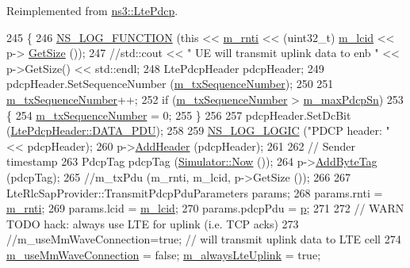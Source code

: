 Reimplemented from \hyperlink{classns3_1_1LtePdcp_ab7db54201309ecb2358b8ae9cff7e4cc}{ns3\+::\+Lte\+Pdcp}.


\begin{DoxyCode}
245 \{
246   \hyperlink{log-macros-disabled_8h_a90b90d5bad1f39cb1b64923ea94c0761}{NS\_LOG\_FUNCTION} (\textcolor{keyword}{this} << \hyperlink{classns3_1_1McUePdcp_a5807c425f6989fee6982fc11fdb5e9a9}{m\_rnti} << (uint32\_t) \hyperlink{classns3_1_1McUePdcp_ad68b36aee03df89a1d476f78c0db4bbc}{m\_lcid} << p->
      \hyperlink{classns3_1_1Packet_a462855c9929954d4301a4edfe55f4f1c}{GetSize} ());
247   \textcolor{comment}{//std::cout << " UE will transmit uplink data to enb " << p->GetSize() << std::endl;}
248   LtePdcpHeader pdcpHeader;
249   pdcpHeader.SetSequenceNumber (\hyperlink{classns3_1_1McUePdcp_a40f14de1c02f288a87aa5f70501cf31e}{m\_txSequenceNumber});
250 
251   \hyperlink{classns3_1_1McUePdcp_a40f14de1c02f288a87aa5f70501cf31e}{m\_txSequenceNumber}++;
252   \textcolor{keywordflow}{if} (\hyperlink{classns3_1_1McUePdcp_a40f14de1c02f288a87aa5f70501cf31e}{m\_txSequenceNumber} > \hyperlink{classns3_1_1McUePdcp_ab397f1cb87dfd3d4362f6d58adf968bc}{m\_maxPdcpSn})
253     \{
254       \hyperlink{classns3_1_1McUePdcp_a40f14de1c02f288a87aa5f70501cf31e}{m\_txSequenceNumber} = 0;
255     \}
256 
257   pdcpHeader.SetDcBit (\hyperlink{classns3_1_1LtePdcpHeader_a3a965023a8f37aad003904c3d64d7ffda5cd4f8c2bc8e87cfae1e626fef42c3d7}{LtePdcpHeader::DATA\_PDU});
258 
259   \hyperlink{group__logging_ga88acd260151caf2db9c0fc84997f45ce}{NS\_LOG\_LOGIC} (\textcolor{stringliteral}{"PDCP header: "} << pdcpHeader);
260   p->\hyperlink{classns3_1_1Packet_a465108c595a0bc592095cbcab1832ed8}{AddHeader} (pdcpHeader);
261 
262   \textcolor{comment}{// Sender timestamp}
263   PdcpTag pdcpTag (\hyperlink{classns3_1_1Simulator_ac3178fa975b419f7875e7105be122800}{Simulator::Now} ());
264   p->\hyperlink{classns3_1_1Packet_ad5997caea8c22757acade2fcb4d7daca}{AddByteTag} (pdcpTag);
265   \textcolor{comment}{//m\_txPdu (m\_rnti, m\_lcid, p->GetSize ());}
266 
267   LteRlcSapProvider::TransmitPdcpPduParameters params;
268   params.rnti = \hyperlink{classns3_1_1McUePdcp_a5807c425f6989fee6982fc11fdb5e9a9}{m\_rnti};
269   params.lcid = \hyperlink{classns3_1_1McUePdcp_ad68b36aee03df89a1d476f78c0db4bbc}{m\_lcid};
270   params.pdcpPdu = \hyperlink{lte__link__budget_8m_ac9de518908a968428863f829398a4e62}{p};
271 
272   \textcolor{comment}{// WARN TODO hack: always use LTE for uplink (i.e. TCP acks)}
273  \textcolor{comment}{//m\_useMmWaveConnection=true;  // will transmit uplink data to LTE cell}
274 \hyperlink{classns3_1_1McUePdcp_ae995f7a56173ed7e2ba8f215c928e5a4}{m\_useMmWaveConnection} = \textcolor{keyword}{false}; \hyperlink{classns3_1_1McUePdcp_add1fd75af318fec889e06a47f4407be7}{m\_alwaysLteUplink} = \textcolor{keyword}{true};

\end{DoxyCode}
